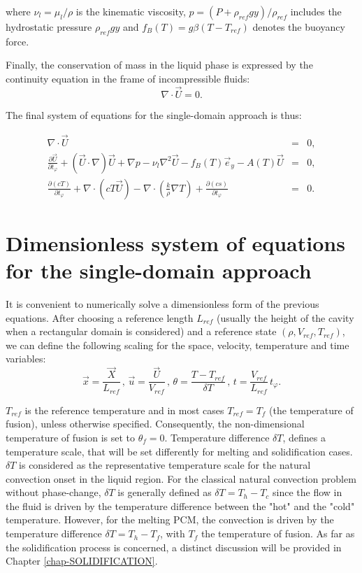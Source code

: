 \noindent where  $\nu_l = \mu_l/\rho$ is the kinematic viscosity,  $p = (P + \rho_{ref} g y)/ \rho_{ref}$ includes the hydrostatic pressure $\rho_{ref} g y$ and $f_B(T) = g \beta (T-T_{ref})$ denotes the buoyancy force.

Finally, the conservation of mass in the liquid phase is expressed by the continuity equation in the frame of incompressible fluids:
\begin{equation}\label{eq-mass-conserv}
\nabla \cdot \vec{U} = 0.
\end{equation} 

\noindent The final system of equations for the single-domain approach is thus: 

\begin{eqnarray} 
	\nabla \cdot \vec{U} &=& 0, \\
	\frac{\partial \vec{U}}{\partial t_{\varphi}} +   {(\vec{U}\cdot\nabla ) \vec{U}} + \nabla p - \nu_{l}  {\nabla^2 \vec{U}} 
- f_B(T) \vec{e}_y - A(T) \vec{U} & = & 0, \\
	\frac{\partial \left(c T\right)}{\partial t_{\varphi}} + \nabla \cdot\left( c T \vec{U}\right) -
\nabla \cdot\left( \frac{k}{\rho} \nabla T \right) +  \frac{\partial \left(c s\right)}{\partial t_{\varphi}}  &=& 0.
\end{eqnarray}


\section{Dimensionless system of equations for the single-domain approach}\label{sec-eq-scaling}

It is convenient to numerically solve a dimensionless form of the previous equations.
After choosing a reference length $L_{ref}$ (usually the height of the cavity when a rectangular domain is considered) and a reference state $(\rho, V_{ref}, T_{ref})$, we can define the following scaling for the space, velocity, temperature and time variables:
\begin{equation}\label{eq-adim}
\vec{x} = \frac{\vec{X}}{L_{ref}} \, , \,  \vec{u} = \frac{\vec{U}}{V_{ref}} \, , \,  \theta = \frac{T-T_{ref}}{\delta T} \, , \,  t = \frac{V_{ref}}{L_{ref}} \, t_{\varphi}.
\end{equation}

\noindent $T_{ref}$ is the reference temperature and in most cases $T_{ref} = T_f$ (the temperature of fusion), unless otherwise specified.
Consequently, the non-dimensional temperature of fusion is set to $\theta_f = 0$.
Temperature difference  $\delta T$, defines a temperature scale, that will be set differently for melting and solidification cases.
$\delta T$ is considered as the representative temperature scale  for the natural convection onset in the liquid region. 
For the classical natural convection problem without phase-change, $\delta T$ is generally defined as $\delta T=T_{h}-T_{c}$ since the flow in the fluid is driven by the temperature difference between the "hot" and the "cold" temperature.
However, for the melting PCM, the convection is driven by the temperature difference $\delta T=T_{h}-T_{f}$, with $T_f$ the temperature of fusion.
As far as the solidification process is concerned, a distinct discussion will be provided in Chapter \ref{chap-SOLIDIFICATION}. 

